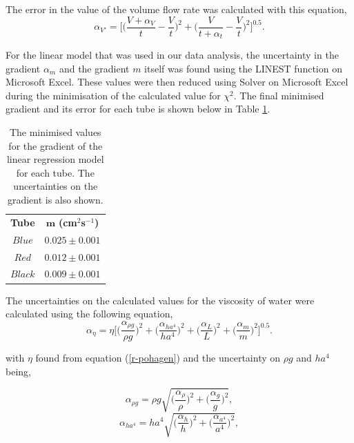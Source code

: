 \documentclass[twocolumn]{revtex4}
\begin{document}
The error in the value of the volume flow rate was calculated with this equation,
\begin{equation} 
\alpha_{V'} = \Bigg[ \Bigg( \frac{V+\alpha_{V}}{t} - \frac{V}{t} \Bigg)^2 + \Bigg( \frac{V}{t+\alpha_{t}} - \frac{V}{t} \Bigg)^2 \Bigg]^{0.5} .
\label{ea-volflow}
\end{equation}

For the linear model that was used in our data analysis, the uncertainty in the gradient $\alpha_m$ and the gradient $m$ itself was found using the LINEST function on Microsoft Excel. These values were then reduced using Solver on Microsoft Excel during the minimisation of the calculated value for $\chi^2$. The final minimised gradient and its error for each tube is shown below in Table \ref{table:2}.
\begin{table}[h!]
\centering
\begin{tabular}{c@{\hskip 20pt}c} 
 \hline
 \textbf{Tube} & $\boldsymbol{m}$ \textbf{(cm$^{2}$s$^{-1}$)} \\ [0.5ex] 
 
 $Blue$ & $0.025 \pm 0.001$ \\ 
 $Red$ & $0.012 \pm 0.001$ \\
 $Black$ & $0.009 \pm 0.001$ \\ 
\hline
\end{tabular}
\caption{The minimised values for the gradient of the linear regression model for each tube. The uncertainties on the gradient is also shown.}
\label{table:2}
\end{table}

The uncertainties on the calculated values for the viscosity of water were calculated using the following equation,
\small
\begin{equation} 
\alpha_{\eta} = \eta \Bigg[ \Bigg( \frac{\alpha_{\rho g}}{\rho g} \Bigg)^2 + \Bigg( \frac{\alpha_{ha^4}}{ha^4} \Bigg)^2 + \Bigg( \frac{\alpha_{L}}{L} \Bigg)^2 + \Bigg( \frac{\alpha_{m}}{m} \Bigg)^2 \Bigg]^{0.5}.
\label{ea-viscos}
\end{equation}
\normalsize

with $\eta$ found from equation (\ref{r-pohagen}) and the uncertainty on $\rho g$ and $ha^4$ being,

\begin{equation} 
\alpha_{\rho g} = \rho g \sqrt{ \Bigg( \frac{\alpha_{\rho}}{\rho} \Bigg)^2 + \Bigg( \frac{\alpha_{g}}{g} \Bigg)^2 }, 
\label{ea-rhog}
\end{equation}
\begin{equation} 
\alpha_{ha^4} = ha^4 \sqrt{ \Bigg( \frac{\alpha_{h}}{h} \Bigg)^2 + \Bigg( \frac{\alpha_{a^4}}{a^4} \Bigg)^2 }, 
\label{ea-hafour}
\end{equation}
\end{document}
